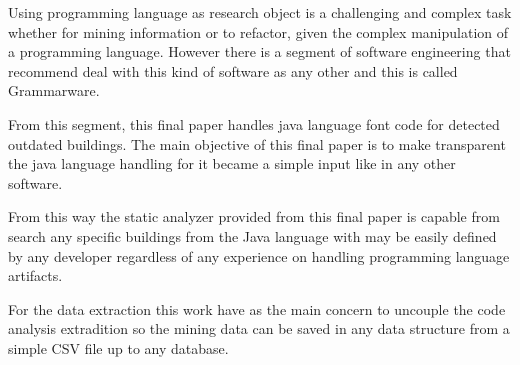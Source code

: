 
Using programming language as research object is a challenging and complex task whether for mining information or to refactor, given the complex manipulation of a programming language. However there is a segment of software engineering that recommend deal with this kind of software as any other and this is called Grammarware.

From this segment, this final paper handles java language font code for detected outdated buildings. The main objective of this final paper is to make transparent the java language handling for it became a simple input like in any other software.

From this way the static analyzer provided from this final paper is capable from search any specific buildings from the Java language with may be easily defined by any developer regardless of any experience on handling programming language artifacts.

For the data extraction this work have as the main concern to uncouple the code analysis extradition so the mining data can be saved in any data structure from a simple CSV file up to any database.






